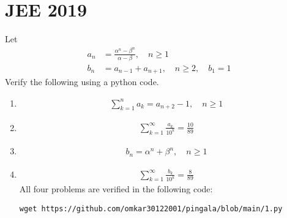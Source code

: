 \documentclass[journal,12pt,twocolumn]{IEEEtran}
\renewcommand\thesection{\arabic{section}}
\begin{document}
\section{JEE 2019}
Let 
\begin{align}
	a_n &= \frac{\alpha^{n}-\beta^{n}}{\alpha - \beta}, \quad n \ge 1
	\\
	b_n &= a_{n-1} + a_{n+1}, \quad n \ge 2, \quad b_1 =1
	\label{eq:10-orig-diff}
\end{align}
Verify the following using a python code.
\begin{enumerate}[label=\thesection.\arabic*
,ref=\thesection.\theenumi]
\item 
\begin{align}
	\sum_{k=1}^{n}a_k = a_{n+2}-1, \quad n \ge 1
\end{align}
 \item 
\begin{align}
	\sum_{k=1}^{\infty}\frac{a_k}{10^k} =\frac{10}{89}
\end{align}
 \item 
\begin{align}
	b_n =\alpha^n + \beta^n, \quad n \ge 1
\end{align}
 \item 
\begin{align}
	\sum_{k=1}^{\infty}\frac{b_k}{10^k} =\frac{8}{89}
\end{align}
All four problems are verified in the following code:
\begin{lstlisting}
wget https://github.com/omkar30122001/pingala/blob/main/1.py
\end{lstlisting}
\end{enumerate}
\end{document}
